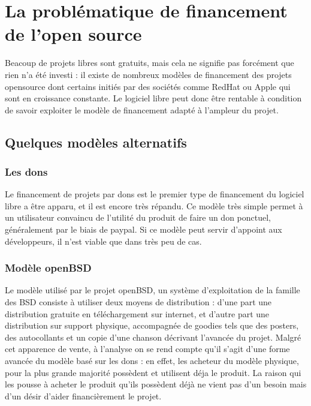 \chapter{La problématique de financement de l'open source}

Beacoup de projets libres sont gratuits, mais cela ne signifie pas forcément
que rien n'a été investi : il existe de nombreux modèles de financement des
projets opensource dont certains initiés par des sociétés comme RedHat ou Apple
qui sont en croissance constante. Le logiciel libre peut donc être rentable à
condition de savoir exploiter le modèle de financement adapté à l'ampleur du
projet.

\section{Quelques modèles alternatifs}

    \subsection{Les dons}

Le financement de projets par dons est le premier type de financement du 
logiciel libre a être apparu, et il est encore très répandu.
Ce modèle très simple permet à un utilisateur convaincu de l'utilité du 
produit de faire un don ponctuel, généralement par le biais de paypal.
Si ce modèle peut servir d'appoint aux développeurs, il n'est viable que dans 
très peu de cas.

    \subsection{Modèle openBSD}

Le modèle utilisé par le projet openBSD, un système d'exploitation de la 
famille des BSD consiste à utiliser deux moyens de distribution : d'une part 
une distribution gratuite en téléchargement sur internet, et d'autre part une 
distribution sur support physique, accompagnée de goodies tels que des posters,
des autocollants et un copie d'une chanson décrivant l'avancée du projet.
Malgré cet apparence de vente, à l'analyse on se rend compte qu'il s'agit
d'une forme avancée du modèle basé sur les dons : en effet, les acheteur du
modèle physique, pour la plus grande majorité possèdent et utilisent déja le 
produit. La raison qui les pousse à acheter le produit qu'ils possèdent déjà 
ne vient pas d'un besoin mais d'un désir d'aider financièrement le projet.

